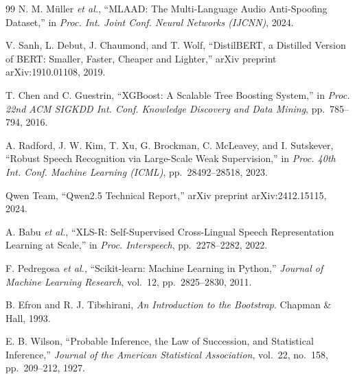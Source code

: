 \begin{thebibliography}{99}
N. M. M{\"u}ller \textit{et al.}, ``{MLAAD}: The Multi-Language Audio Anti-Spoofing Dataset,'' in \textit{Proc. Int. Joint Conf. Neural Networks (IJCNN)}, 2024.

V. Sanh, L. Debut, J. Chaumond, and T. Wolf, ``{DistilBERT}, a Distilled Version of {BERT}: Smaller, Faster, Cheaper and Lighter,'' arXiv preprint arXiv:1910.01108, 2019.

T. Chen and C. Guestrin, ``{XGBoost}: A Scalable Tree Boosting System,'' in \textit{Proc. 22nd ACM SIGKDD Int. Conf. Knowledge Discovery and Data Mining}, pp.~785--794, 2016.

A. Radford, J. W. Kim, T. Xu, G. Brockman, C. McLeavey, and I. Sutskever, ``Robust Speech Recognition via Large-Scale Weak Supervision,'' in \textit{Proc. 40th Int. Conf. Machine Learning (ICML)}, pp.~28492--28518, 2023.

Qwen Team, ``{Qwen2.5} Technical Report,'' arXiv preprint arXiv:2412.15115, 2024.

A. Babu \textit{et al.}, ``{XLS-R}: Self-Supervised Cross-Lingual Speech Representation Learning at Scale,'' in \textit{Proc. Interspeech}, pp.~2278--2282, 2022.

F. Pedregosa \textit{et al.}, ``Scikit-learn: Machine Learning in {P}ython,'' \textit{Journal of Machine Learning Research}, vol.~12, pp.~2825--2830, 2011.

B. Efron and R. J. Tibshirani, \textit{An Introduction to the Bootstrap}. Chapman \& Hall, 1993.

E. B. Wilson, ``Probable Inference, the Law of Succession, and Statistical Inference,'' \textit{Journal of the American Statistical Association}, vol.~22, no.~158, pp.~209--212, 1927.

\end{thebibliography}
